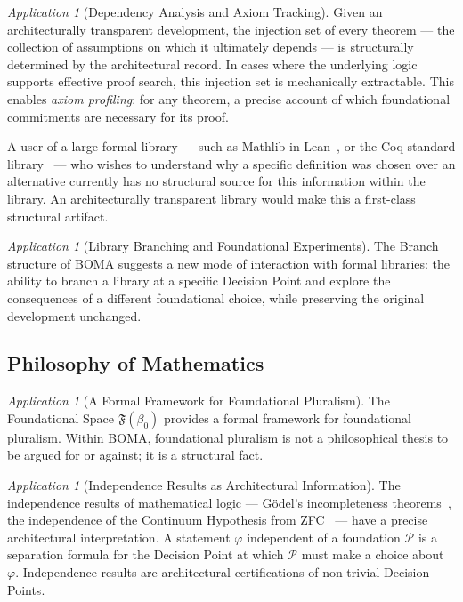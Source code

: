 \documentclass[12pt, a4paper]{article}
\theoremstyle{plain}
\theoremstyle{definition}
\theoremstyle{remark}
\newtheorem{application}[theorem]{Application}
\newcommand{\FS}[1]{\mathfrak{F}(#1)}
\newcommand{\BOMA}{\textsf{BOMA}}
\begin{document}
\begin{application}[Dependency Analysis and Axiom Tracking]
\label{app:axiom-tracking}
Given an architecturally transparent development, the injection set of
every theorem --- the collection of assumptions on which it ultimately
depends --- is structurally determined by the architectural record. In
cases where the underlying logic supports effective proof search, this
injection set is mechanically extractable. This enables \emph{axiom
profiling}: for any theorem, a precise account of which foundational
commitments are necessary for its proof.

A user of a large formal library --- such as Mathlib in Lean~\cite{LeanCommunity2023},
or the Coq standard library~\cite{Coq2023} --- who wishes to understand
why a specific definition was chosen over an alternative currently has
no structural source for this information within the library. An
architecturally transparent library would make this a first-class
structural artifact.
\end{application}

\begin{application}[Library Branching and Foundational Experiments]
\label{app:branching}
The Branch structure of \BOMA{} suggests a new mode of interaction with
formal libraries: the ability to branch a library at a specific
Decision Point and explore the consequences of a different foundational
choice, while preserving the original development unchanged.
\end{application}

\subsection{Philosophy of Mathematics}
\label{subsec:philosophy}

\begin{application}[A Formal Framework for Foundational Pluralism]
\label{app:pluralism}
The Foundational Space $\FS{\beta_0}$ provides a formal framework for
foundational pluralism. Within \BOMA{}, foundational pluralism is not a
philosophical thesis to be argued for or against; it is a structural fact.
\end{application}

\begin{application}[Independence Results as Architectural Information]
\label{app:independence}
The independence results of mathematical logic --- G\"{o}del's
incompleteness theorems~\cite{Goedel1931}, the independence of the
Continuum Hypothesis from ZFC~\cite{Cohen1963,Cohen1964,Goedel1938,Goedel1940}
--- have a precise architectural interpretation. A statement $\varphi$
independent of a foundation $\mathcal{P}$ is a separation formula for
the Decision Point at which $\mathcal{P}$ must make a choice about
$\varphi$. Independence results are architectural certifications of
non-trivial Decision Points.
\end{application}
\end{document}
